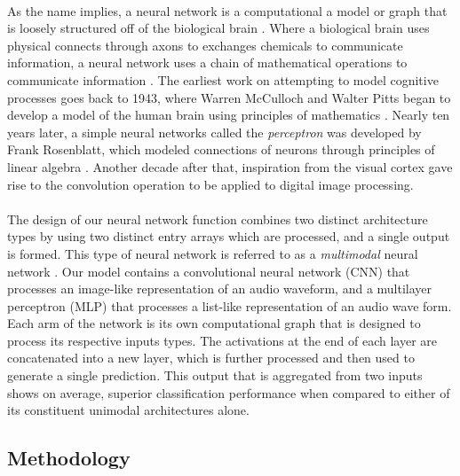 \documentclass[12pt,letterpaper]{article}
\begin{document}
\paragraph*{}As the name implies, a neural network is a computational a model or graph that is loosely structured off of the biological brain \cite{Geron,Loy}. Where a biological brain uses physical connects through axons to exchanges chemicals to communicate information, a neural network uses a chain of mathematical operations to communicate information \cite{Goodfellow}. The earliest work on attempting to model cognitive processes goes back to 1943, where Warren McCulloch and Walter Pitts began to develop a model of the human brain using principles of mathematics \cite{McCulloch,Loy}. Nearly ten years later, a simple neural networks called the \textit{perceptron} was developed by Frank Rosenblatt, which modeled connections of neurons through principles of linear algebra \cite{Geron,Petrik}. Another decade after that, inspiration from the visual cortex gave rise to the convolution operation to be applied to digital image processing. 

\paragraph*{}The design of our neural network function combines two distinct architecture types by using two distinct entry arrays which are processed, and a single output is formed. This type of neural network is referred to as a \textit{multimodal} neural network \cite{Li,Ngiam}. Our model contains a convolutional neural network (CNN) that processes an image-like representation of an audio waveform, and a multilayer perceptron (MLP) that processes a list-like representation of an audio wave form. Each arm of the network is its own computational graph that is designed to process its respective inputs types. The activations at the end of each layer are concatenated into a new layer, which is further processed and then used to generate a single prediction. This output that is aggregated from two inputs shows on average, superior classification performance when compared to either of its constituent unimodal architectures alone.


\newpage
\subsection{Methodology}
\label{sec-Methodology}
\end{document}
